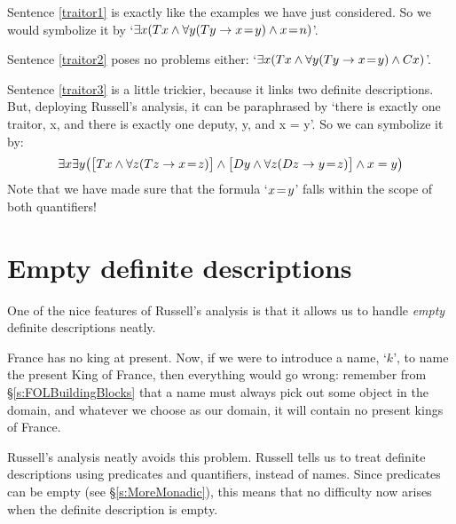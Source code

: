 Sentence \ref{traitor1} is exactly like the examples we have just considered. So we would symbolize it by `$\exists x (Tx \wedge \forall y(Ty \rightarrow x \!=\! y) \wedge x \!=\! n)$'. 

Sentence \ref{traitor2} poses no problems either: `$\exists x (Tx \wedge \forall y(Ty \rightarrow x \!=\! y) \wedge Cx)$'.

Sentence \ref{traitor3} is a little trickier, because it links two definite descriptions. But, deploying  Russell's analysis, it can be paraphrased by `there is exactly one traitor, x, and there is exactly one deputy, y, and x = y'. So we can symbolize it by: 
$$\exists x \exists y \bigl(\bigl[Tx \wedge \forall z(Tz \rightarrow x \!=\! z)\bigr] \wedge \bigl[Dy \wedge \forall z(Dz \rightarrow y \!=\! z)\bigr] \wedge x = y\bigr)$$
Note that we have made sure that the formula `$x \!=\! y$' falls within the scope of both quantifiers!

\section{Empty definite descriptions}
One of the nice features of Russell's analysis is that it allows us to handle \emph{empty} definite descriptions neatly. 

France has no king at present. Now, if we were to introduce a name, `$k$', to name the present King of France, then everything would go wrong: remember from \S\ref{s:FOLBuildingBlocks} that a name must always pick out  some object in the domain, and whatever we choose as our domain, it will contain no present kings of France. 

Russell's analysis neatly avoids this problem. Russell tells us to treat definite descriptions using predicates and quantifiers, instead of names. Since predicates can be empty (see \S\ref{s:MoreMonadic}), this means that no difficulty now arises when the definite description is empty. 

